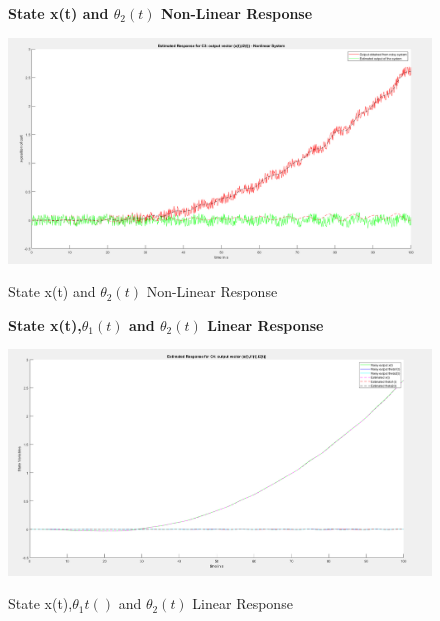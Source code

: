 \documentclass[12pt]{article}
\begin{document}
\begin{figure}[H]
    \centering
    \textbf{State x(t) and $\theta_2(t)$ Non-Linear Response}\par\medskip
    \includegraphics[scale = 0.35]{StateXth2NonLinearResponse.png}\\[0.0 cm]	%
    \caption{State x(t) and $\theta_2(t)$ Non-Linear Response} 
\end{figure}

\begin{figure}[H]
    \centering
    \textbf{State x(t),$\theta_1(t)$ and $\theta_2(t)$ Linear Response}\par\medskip
    \includegraphics[scale = 0.35]{StateXtht1tht2NonLinear.png}\\[0.0 cm]	%
    \caption{State x(t),$\theta_1t()$ and $\theta_2(t)$ Linear Response} 
\end{figure}
\end{document}
